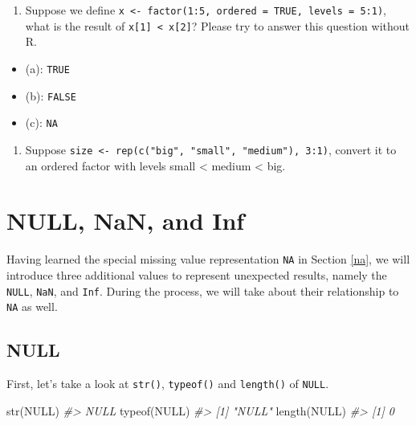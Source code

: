 \documentclass[
]{book}
\newenvironment{Shaded}{\begin{snugshade}}{\end{snugshade}}
\newcommand{\CommentTok}[1]{\textcolor[rgb]{0.56,0.35,0.01}{\textit{#1}}}
\newcommand{\ConstantTok}[1]{\textcolor[rgb]{0.00,0.00,0.00}{#1}}
\newcommand{\FunctionTok}[1]{\textcolor[rgb]{0.00,0.00,0.00}{#1}}
\newcommand{\NormalTok}[1]{#1}
\providecommand{\tightlist}{%
  \setlength{\itemsep}{0pt}\setlength{\parskip}{0pt}}
\begin{document}
\begin{enumerate}
\def\labelenumi{\arabic{enumi}.}
\setcounter{enumi}{3}
\tightlist
\item
  Suppose we define \texttt{x\ \textless{}-\ factor(1:5,\ ordered\ =\ TRUE,\ levels\ =\ 5:1)}, what is the result of \texttt{x{[}1{]}\ \textless{}\ x{[}2{]}}? Please try to answer this question without R.
\end{enumerate}

\begin{itemize}
\tightlist
\item
  (a): \texttt{TRUE}
\item
  (b): \texttt{FALSE}
\item
  (c): \texttt{NA}
\end{itemize}

\begin{enumerate}
\def\labelenumi{\arabic{enumi}.}
\setcounter{enumi}{4}
\tightlist
\item
  Suppose \texttt{size\ \textless{}-\ rep(c("big",\ "small",\ "medium"),\ 3:1)}, convert it to an ordered factor with levels small \textless{} medium \textless{} big.
\end{enumerate}

\hypertarget{null}{%
\section{NULL, NaN, and Inf}\label{null}}

Having learned the special missing value representation \texttt{NA} in Section \ref{na}, we will introduce three additional values to represent unexpected results, namely the \texttt{NULL}, \texttt{NaN}, and \texttt{Inf}. During the process, we will take about their relationship to \texttt{NA} as well.

\hypertarget{null-1}{%
\subsection{NULL}\label{null-1}}

First, let's take a look at \texttt{str()}, \texttt{typeof()} and \texttt{length()} of \texttt{NULL}.

\begin{Shaded}
\begin{Highlighting}[]
\FunctionTok{str}\NormalTok{(}\ConstantTok{NULL}\NormalTok{)}
\CommentTok{\#\textgreater{}  NULL}
\FunctionTok{typeof}\NormalTok{(}\ConstantTok{NULL}\NormalTok{)}
\CommentTok{\#\textgreater{} [1] "NULL"}
\FunctionTok{length}\NormalTok{(}\ConstantTok{NULL}\NormalTok{)}
\CommentTok{\#\textgreater{} [1] 0}
\end{Highlighting}
\end{Shaded}
\end{document}
